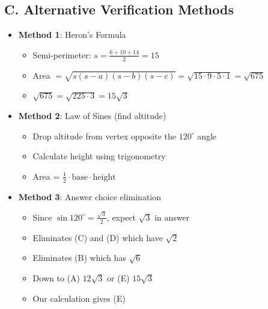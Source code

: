 \documentclass[12pt]{article}
\begin{document}
\begin{verificationbox}
\subsection*{C. Alternative Verification Methods}
\begin{itemize}[leftmargin=*]
    \item \textbf{Method 1}: Heron's Formula
    \begin{itemize}
        \item Semi-perimeter: $s = \frac{6 + 10 + 14}{2} = 15$
        \item Area $= \sqrt{s(s-a)(s-b)(s-c)} = \sqrt{15 \cdot 9 \cdot 5 \cdot 1} = \sqrt{675}$
        \item $\sqrt{675} = \sqrt{225 \cdot 3} = 15\sqrt{3}$ \checkmark
    \end{itemize}
    \item \textbf{Method 2}: Law of Sines (find altitude)
    \begin{itemize}
        \item Drop altitude from vertex opposite the $120^\circ$ angle
        \item Calculate height using trigonometry
        \item Area = $\frac{1}{2} \cdot \text{base} \cdot \text{height}$
    \end{itemize}
    \item \textbf{Method 3}: Answer choice elimination
    \begin{itemize}
        \item Since $\sin 120^\circ = \frac{\sqrt{3}}{2}$, expect $\sqrt{3}$ in answer
        \item Eliminates (C) and (D) which have $\sqrt{2}$
        \item Eliminates (B) which has $\sqrt{6}$
        \item Down to (A) $12\sqrt{3}$ or (E) $15\sqrt{3}$
        \item Our calculation gives (E)
    \end{itemize}
\end{itemize}
\end{verificationbox}
\end{document}
